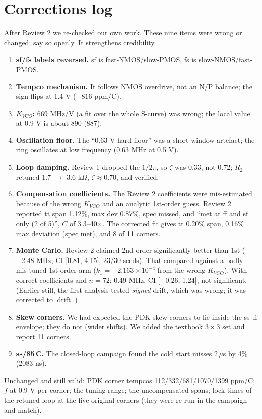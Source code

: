 \documentclass[11pt,a4paper]{article}
\newcommand{\degC}{\textdegree C}
\begin{document}
\section{Corrections log}\label{sec:corr}
\begin{owned}
After Review 2 we re-checked our own work. These nine items were wrong or changed; say so openly. It strengthens credibility.
\begin{enumerate}
\item \textbf{sf/fs labels reversed.} sf is fast-NMOS/slow-PMOS, fs is slow-NMOS/fast-PMOS.
\item \textbf{Tempco mechanism.} It follows NMOS overdrive, not an N/P balance; the sign flips at 1.4 V ($-816$ ppm/\degC).
\item \textbf{$K_{VCO}$:} 669 MHz/V (a fit over the whole S-curve) was wrong; the local value at 0.9 V is about 890 (887).
\item \textbf{Oscillation floor.} The ``0.63 V hard floor'' was a short-window artefact; the ring oscillates at low frequency (0.63 MHz at 0.5 V).
\item \textbf{Loop damping.} Review 1 dropped the $1/2\pi$, so $\zeta$ was 0.33, not 0.72; $R_2$ retuned 1.7 $\to$ 3.6 k$\Omega$, $\zeta\approx0.70$, and verified.
\item \textbf{Compensation coefficients.} The Review 2 coefficients were mis-estimated because of the wrong $K_{VCO}$ and an analytic 1st-order guess. Review 2 reported tt span 1.12\%, max dev 0.87\%, spec missed, and ``met at ff and sf only (2 of 5)'', $C$ of 3.3--40$\times$. The corrected fit gives tt 0.20\% span, 0.16\% max deviation (spec met), and 8 of 11 corners.
\item \textbf{Monte Carlo.} Review 2 claimed 2nd order significantly better than 1st ($-2.48$ MHz, CI [0.81, 4.15], 23/30 seeds). That compared against a badly mis-tuned 1st-order arm ($k_1=-2.163\times10^{-4}$ from the wrong $K_{VCO}$). With correct coefficients and $n=72$: 0.49 MHz, CI [$-0.26$, 1.24], not significant. (Earlier still, the first analysis tested \emph{signed} drift, which was wrong; it was corrected to $|$drift$|$.)
\item \textbf{Skew corners.} We had expected the PDK skew corners to lie inside the ss--ff envelope; they do not (wider shifts). We added the textbook $3\times3$ set and report 11 corners.
\item \textbf{ss/85\,\degC.} The closed-loop campaign found the cold start misses 2\,$\mu$s by 4\% (2083 ns).
\end{enumerate}
\end{owned}
\noindent Unchanged and still valid: PDK corner tempcos 112/332/681/1070/1399 ppm/\degC; $f$ at 0.9 V per corner; the tuning range; the uncompensated spans; lock times of the retuned loop at the five original corners (they were re-run in the campaign and match).
\end{document}
